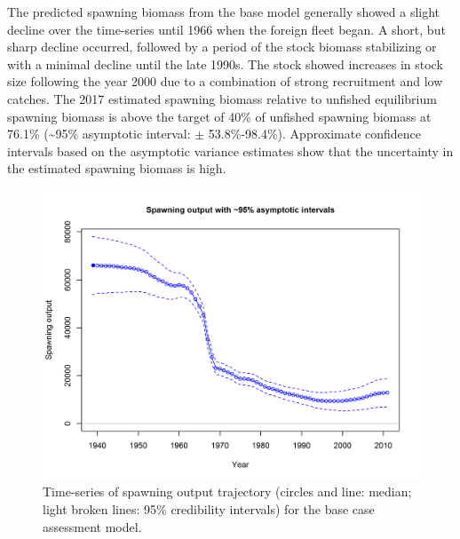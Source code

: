 \documentclass[12pt,]{article}
\begin{document}
The predicted spawning biomass from the base model generally showed a
slight decline over the time-series until 1966 when the foreign fleet
began. A short, but sharp decline occurred, followed by a period of the
stock biomass stabilizing or with a minimal decline until the late
1990s. The stock showed increases in stock size following the year 2000
due to a combination of strong recruitment and low catches. The 2017
estimated spawning biomass relative to unfished equilibrium spawning
biomass is above the target of 40\% of unfished spawning biomass at
76.1\% (\textasciitilde{}95\% asymptotic interval: \(\pm\)
53.8\%-98.4\%). Approximate confidence intervals based on the asymptotic
variance estimates show that the uncertainty in the estimated spawning
biomass is high.

\begin{figure}
\centering
\includegraphics{r4ss/plots_mod1/ts7_Spawning_output_with_95_asymptotic_intervals_intervals.png}
\caption{Time-series of spawning output trajectory (circles and line:
median; light broken lines: 95\% credibility intervals) for the base
case assessment model. \label{fig:Spawnbio_all}}
\end{figure}
\end{document}
